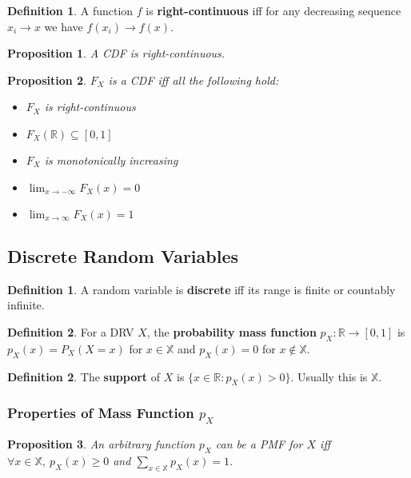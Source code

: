 \documentclass[12pt]{article}
\newtheorem*{prop*}{Proposition}
\theoremstyle{definition}
\newtheorem{defn}{Definition}[subsection]
\newtheorem*{defn*}{Definition}
\newcommand{\R}{\mathbb{R}}
\newcommand{\X}{\mathbb{X}}
\begin{document}
\begin{defn*}
  A function $f$ is \textbf{right-continuous} iff for any decreasing sequence $x_i \to x$ we have $f(x_i) \to f(x)$.
\end{defn*}

\begin{prop*}
  A CDF is right-continuous.
\end{prop*}

\begin{prop*}
  $F_X$ is a CDF iff all the following hold:
  \begin{itemize}
    \item $F_X$ is right-continuous
    \item $F_X(\R) \subseteq [0, 1]$
    \item $F_X$ is monotonically increasing
    \item $\lim_{x \to -\infty}F_X(x) = 0$
    \item $\lim_{x \to \infty}F_X(x) = 1$
  \end{itemize}
\end{prop*}

\subsection{Discrete Random Variables}

\begin{defn}
  A random variable is \textbf{discrete} iff its range is finite or countably infinite.
\end{defn}

\begin{defn}
  For a DRV $X$, the \textbf{probability mass function} $p_X : \R \to [0, 1]$ is $p_X(x) = P_X(X = x)$ for $x \in \X$ and $p_X(x) = 0$ for $x \notin \X$.
\end{defn}

\begin{defn*}
  The \textbf{support} of $X$ is $\{x \in \R : p_X(x) > 0\}$.
  Usually this is $\X$.
\end{defn*}

\subsubsection{Properties of Mass Function $p_X$}

\begin{prop*}
  An arbitrary function $p_X$ can be a PMF for $X$ iff $\forall x \in \X,\ p_X(x) \geq 0$ and $\sum_{x \in \X}p_X(x) = 1$.
\end{prop*}
\end{document}
